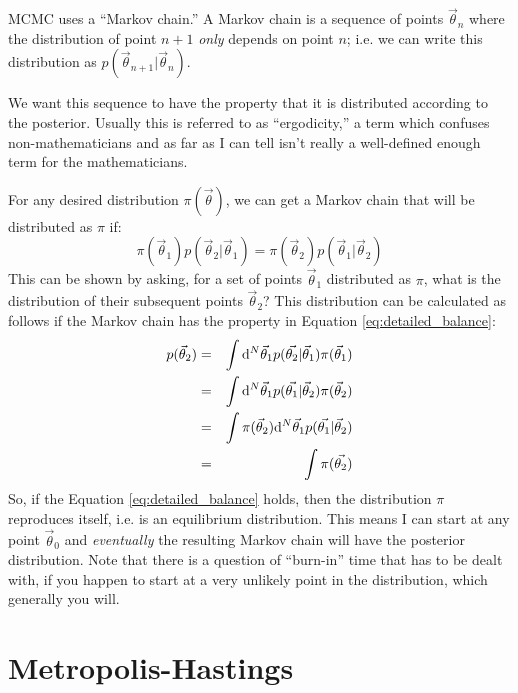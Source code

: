 MCMC uses a ``Markov chain.'' A Markov chain is a sequence of points
$\vec{\theta}_n$ where the distribution of point $n+1$ {\it only}
depends on point $n$; i.e. we can write this distribution as
$p(\vec{\theta}_{n+1} | \vec{\theta}_n)$.

We want this sequence to have the property that it is distributed
according to the posterior. Usually this is referred to as
``ergodicity,'' a term which confuses non-mathematicians and as far as
I can tell isn't really a well-defined enough term for the
mathematicians.

For any desired distribution $\pi(\vec{\theta})$, we can get a Markov
chain that will be distributed as $\pi$ if:
\begin{equation}
\label{eq:detailed_balance}
\pi(\vec{\theta}_1)
p(\vec{\theta}_2 | \vec{\theta}_1) = 
\pi(\vec{\theta}_2)
p(\vec{\theta}_1 | \vec{\theta}_2)
\end{equation}
This can be shown by asking, for a set of points $\vec{\theta}_1$
distributed as $\pi$, what is the distribution of their subsequent
points $\vec{\theta}_2$?
This distribution can be calculated as follows if the Markov chain has
the property in Equation \ref{eq:detailed_balance}:
\begin{eqnarray}
  p(\vec{\theta}_2) &=&
  \int {\rm d}^N\vec{\theta}_1 p(\vec{\theta_2} | \vec{\theta}_1)
  \pi(\vec{\theta}_1) \cr
  &=&
  \int {\rm d}^N\vec{\theta}_1 p(\vec{\theta_1} | \vec{\theta}_2)
  \pi(\vec{\theta}_2) \cr
  &=&
  \int \pi(\vec{\theta}_2) {\rm d}^N\vec{\theta}_1 p(\vec{\theta_1} |
  \vec{\theta}_2) \cr
  &=&
  \int \pi(\vec{\theta_2}) 
\end{eqnarray}
So, if the Equation \ref{eq:detailed_balance} holds, then the
distribution $\pi$ reproduces itself, i.e. is an equilibrium
distribution. This means I can start at any point $\vec{\theta}_0$ and
{\it eventually} the resulting Markov chain will have the posterior
distribution. Note that there is a question of ``burn-in'' time that
has to be dealt with, if you happen to start at a very unlikely point
in the distribution, which generally you will.

\section{Metropolis-Hastings}

